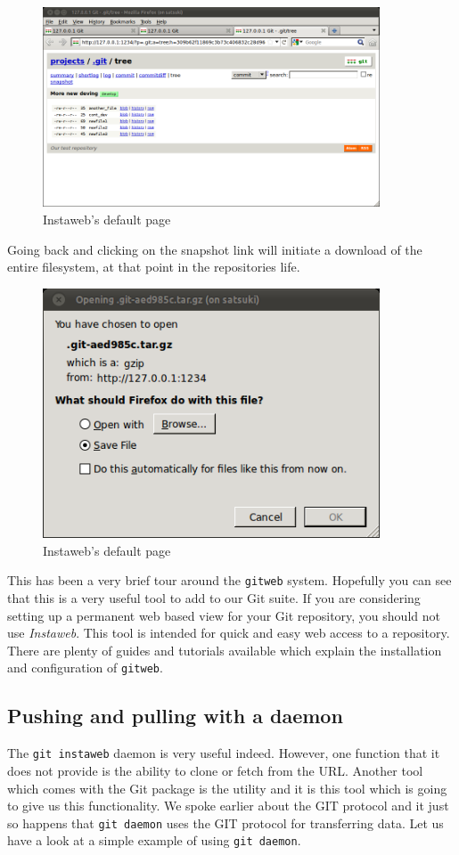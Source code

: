 \begin{figure}[hbt]
\centering
\includegraphics[width=10cm]{images/f-af7-d5.png}
\caption{Instaweb's default page}
\end{figure}

Going back and clicking on the snapshot link will initiate a download of the entire filesystem, at that point in the repositories life.

\begin{figure}[hbt]
\centering
\includegraphics[width=10cm]{images/f-af7-d6.png}
\caption{Instaweb's default page}
\end{figure}

This has been a very brief tour around the \texttt{gitweb} system.
Hopefully you can see that this is a very useful tool to add to our Git suite.
If you are considering setting up a permanent web based view for your Git repository, you should not use \emph{Instaweb}.
This tool is intended for quick and easy web access to a repository.
There are plenty of guides and tutorials available which explain the installation and configuration of \texttt{gitweb}.

\subsection{Pushing and pulling with a daemon}
The \texttt{git instaweb} daemon is very useful indeed.
However, one function that it does not provide is the ability to clone or fetch from the URL.
Another tool which comes with the Git package is the  utility and it is this tool which is going to give us this functionality.
We spoke earlier about the GIT protocol and it just so happens that \texttt{git daemon} uses the GIT protocol for transferring data.
Let us have a look at a simple example of using \texttt{git daemon}.

